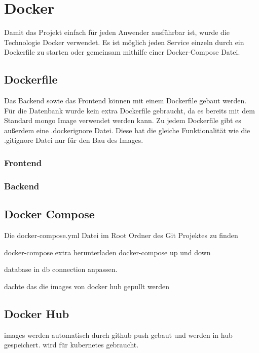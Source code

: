 \chapter{Docker}\label{ch:hosting}
Damit das Projekt einfach für jeden Anwender ausführbar ist, wurde die Technologie Docker verwendet. Es ist möglich jeden Service einzeln durch ein Dockerfile zu starten oder gemeinsam mithilfe einer Docker-Compose Datei.

\section{Dockerfile}
Das Backend sowie das Frontend können mit einem Dockerfile gebaut werden. Für die Datenbank wurde kein extra Dockerfile gebraucht, da es bereits mit dem Standard mongo Image verwendet werden kann. Zu jedem Dockerfile gibt es außerdem eine .dockerignore Datei. Diese hat die gleiche Funktionalität wie die .gitignore Datei nur für den Bau des Images.

\subsection{Frontend}
\subsection{Backend}

\section{Docker Compose}
Die docker-compose.yml Datei im Root Ordner des Git Projektes zu finden

docker-compose extra herunterladen
docker-compose up und down

database in db connection anpassen.

dachte das die images von docker hub gepullt werden


\section{Docker Hub}

images werden automatisch durch github push gebaut und werden in hub gespeichert.
wird für kubernetes gebraucht.